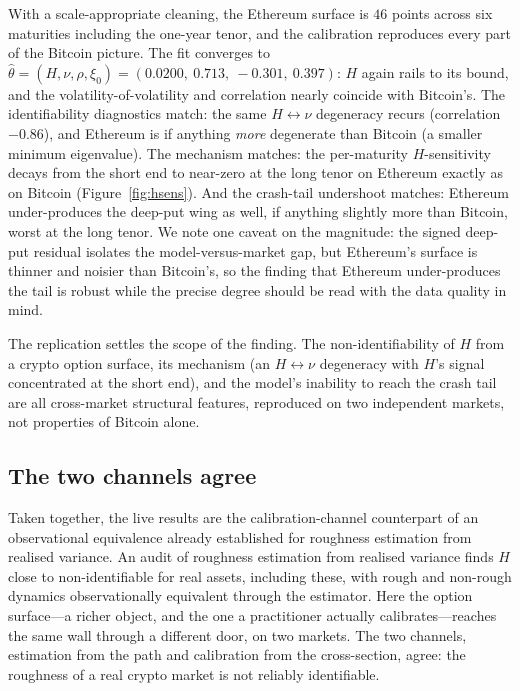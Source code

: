 \documentclass[11pt,a4paper]{article}
\numberwithin{equation}{section}
\begin{document}
With a scale-appropriate cleaning, the Ethereum surface is $46$ points across six maturities including
the one-year tenor, and the calibration reproduces every part of the Bitcoin picture. The fit converges
to $\hat\theta = (H,\nu,\rho,\xi_0) = (0.0200,\ 0.713,\ -0.301,\ 0.397)$: $H$ again rails to its bound,
and the volatility-of-volatility and correlation nearly coincide with Bitcoin's. The identifiability
diagnostics match: the same $H\leftrightarrow\nu$ degeneracy recurs (correlation
$-0.86$), and Ethereum is if anything \emph{more} degenerate than Bitcoin (a smaller minimum
eigenvalue). The mechanism matches: the per-maturity
$H$-sensitivity decays from the short end to near-zero at the long tenor on Ethereum exactly as on
Bitcoin (Figure~\ref{fig:hsens}). And the crash-tail undershoot matches: Ethereum under-produces the
deep-put wing as well, if anything slightly more than Bitcoin, worst at the long tenor. We note one
caveat on the magnitude: the signed deep-put residual isolates the model-versus-market gap, but
Ethereum's surface is thinner and noisier than Bitcoin's, so the finding that Ethereum under-produces
the tail is robust while the precise degree should be read with the data quality in mind.

The replication settles the scope of the finding. The non-identifiability of $H$ from a crypto option
surface, its mechanism (an $H\leftrightarrow\nu$ degeneracy with $H$'s signal concentrated at the
short end), and the model's inability to reach the crash tail are all cross-market structural
features, reproduced on two independent markets, not properties of Bitcoin alone.

\subsection{The two channels agree}

Taken together, the live results are the calibration-channel counterpart of an observational
equivalence already established for roughness estimation from realised variance. An audit of roughness
estimation from realised variance finds $H$ close to non-identifiable for real assets, including these,
with rough and non-rough dynamics observationally equivalent through the estimator. Here the option
surface---a richer object, and the one a practitioner actually calibrates---reaches the same wall
through a different door, on two markets. The two channels, estimation from the path and calibration
from the cross-section, agree: the roughness of a real crypto market is not reliably identifiable.
\end{document}
